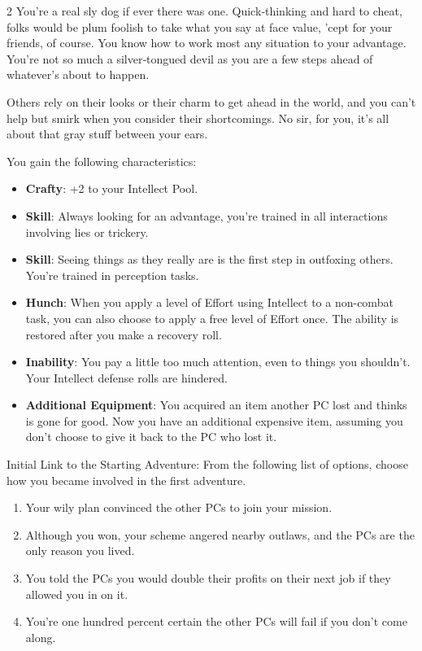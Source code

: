 \begin{multicols}{2}
You’re a real sly dog if ever there was one. Quick‑thinking and hard to cheat, folks would be plum foolish to take what you say at face value, ’cept for your friends, of course. You know how to work most any situation to your advantage. You’re not so much a silver‑tongued devil as you are a few steps ahead of whatever’s about to happen.

Others rely on their looks or their charm to get ahead in the world, and you can’t help but smirk when you consider their shortcomings. No sir, for you, it’s all about that gray stuff between your ears.

You gain the following characteristics: 
\begin{itemize}
\item \textbf{Crafty}: +2 to your Intellect Pool. 
\item \textbf{Skill}: Always looking for an advantage, you’re trained in all interactions involving lies or trickery. 
\item \textbf{Skill}: Seeing things as they really are is the first step in outfoxing others. You’re trained in perception tasks. 
\item \textbf{Hunch}: When you apply a level of Effort using Intellect to a non-combat task, you can also choose to apply a free level of Effort once. The ability is restored after you make a recovery roll. 
\item \textbf{Inability}: You pay a little too much attention, even to things you shouldn’t. Your Intellect defense rolls are hindered. 
\item \textbf{Additional Equipment}: You acquired an item another PC lost and thinks is gone for good. Now you have an additional expensive item, assuming you don’t choose to give it back to the PC who lost it.
\end{itemize}

Initial Link to the Starting Adventure: From the following list of options, choose how you became involved in the first adventure.

\begin{enumerate}
\item Your wily plan convinced the other PCs to join your mission.
\item Although you won, your scheme angered nearby outlaws, and the PCs are the only reason you lived.
\item You told the PCs you would double their profits on their next job if they allowed you in on it.
\item You’re one hundred percent certain the other PCs will fail if you don’t come along.
\end{enumerate}


\end{multicols}
